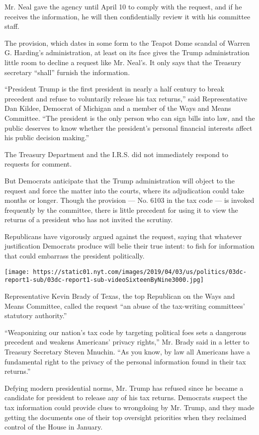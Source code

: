 Mr. Neal gave the agency until April 10 to comply with the request, and
if he receives the information, he will then confidentially review it
with his committee staff.

The provision, which dates in some form to the Teapot Dome scandal of
Warren G. Harding's administration, at least on its face gives the Trump
administration little room to decline a request like Mr. Neal's. It only
says that the Treasury secretary ``shall'' furnish the information.

``President Trump is the first president in nearly a half century to
break precedent and refuse to voluntarily release his tax returns,''
said Representative Dan Kildee, Democrat of Michigan and a member of the
Ways and Means Committee. ``The president is the only person who can
sign bills into law, and the public deserves to know whether the
president's personal financial interests affect his public decision
making.''

The Treasury Department and the I.R.S. did not immediately respond to
requests for comment.

But Democrats anticipate that the Trump administration will object to
the request and force the matter into the courts, where its adjudication
could take months or longer. Though the provision --- No. 6103 in the
tax code --- is invoked frequently by the committee, there is little
precedent for using it to view the returns of a president who has not
invited the scrutiny.

Republicans have vigorously argued against the request, saying that
whatever justification Democrats produce will belie their true intent:
to fish for information that could embarrass the president politically.

\texttt{[image: https://static01.nyt.com/images/2019/04/03/us/politics/03dc-report1-sub/03dc-report1-sub-videoSixteenByNine3000.jpg]}

Representative Kevin Brady of Texas, the top Republican on the Ways and
Means Committee, called the request ``an abuse of the tax-writing
committees' statutory authority.''

``Weaponizing our nation's tax code by targeting political foes sets a
dangerous precedent and weakens Americans' privacy rights,'' Mr. Brady
said in a letter to Treasury Secretary Steven Mnuchin. ``As you know, by
law all Americans have a fundamental right to the privacy of the
personal information found in their tax returns.''

Defying modern presidential norms, Mr. Trump has refused since he became
a candidate for president to release any of his tax returns. Democrats
suspect the tax information could provide clues to wrongdoing by Mr.
Trump, and they made getting the documents one of their top oversight
priorities when they reclaimed control of the House in January.

